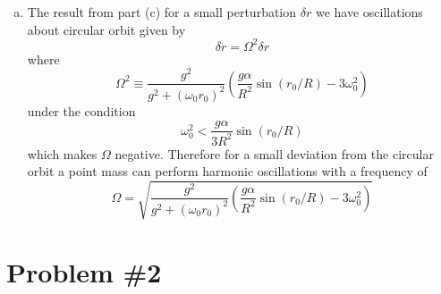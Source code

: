\documentclass[11pt]{article}
\numberwithin{equation}{section}
\begin{document}
\begin{enumerate}[(a)]
\item
The result from part (c) for a small perturbation $\delta{r}$ we have oscillations about 
circular orbit given by
$$\delta\ddot{r} = \Omega^2\delta{r}$$
where
$$\Omega^2\equiv\frac{g^2}{g^2 + (\omega_0r_0)^2}\left(\frac{g\alpha}{R^2}\sin(r_0/R)-3\omega_0^2\right)$$
under the condition 
$$\omega_0^2 < \frac{g\alpha}{3R^2}\sin(r_0/R)$$
which makes $\Omega$ negative. Therefore for a small deviation from the circular orbit a 
point mass can perform harmonic oscillations with a frequency of 
$$\Omega = \sqrt{\frac{g^2}{g^2 + (\omega_0r_0)^2}\left(\frac{g\alpha}{R^2}\sin(r_0/R)-3\omega_0^2\right)}$$
\end{enumerate}

\pagebreak

\section{Problem \#2}
\end{document}
